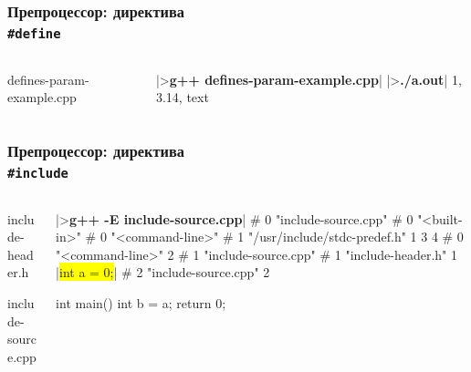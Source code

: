 \documentclass[compress]{beamer}
\newcommand{\shellprompt}{>}
\newcommand{\shellcommand}[1]{\shellprompt \space \textbf{#1}}
\begin{document}
\begin{frame}[fragile]

    \frametitle{Препроцессор: директива \\ \texttt{\#define}}

    \begin{columns}[T]

        \begin{column}{0.5\textwidth}

                {defines-param-example.cpp}

        \end{column}

        \begin{column}{0.5\textwidth}

            \begin{ConsoleWindow}[\scriptsize]
|\shellcommand{g++ defines-param-example.cpp}|
|\shellcommand{./a.out}|
1, 3.14, text
            \end{ConsoleWindow}

        \end{column}

    \end{columns}

\end{frame}

\begin{frame}[fragile]

    \frametitle{Препроцессор: директива \\ \texttt{\#include}}

    \begin{columns}[T]

        \begin{column}{0.5\textwidth}

                {include-header.h}

                {include-source.cpp}

        \end{column}

        \begin{column}{0.5\textwidth}

            \begin{ConsoleWindow}
|\shellcommand{g++ -E include-source.cpp}|
# 0 "include-source.cpp"
# 0 "<built-in>"
# 0 "<command-line>"
# 1 "/usr/include/stdc-predef.h" 1 3 4
# 0 "<command-line>" 2
# 1 "include-source.cpp"
# 1 "include-header.h" 1
|\colorbox{yellow}{int a = 0;}|
# 2 "include-source.cpp" 2

int main() {
    int b = a;
    return 0;
}
            \end{ConsoleWindow}

        \end{column}

    \end{columns}

\end{frame}
\end{document}
